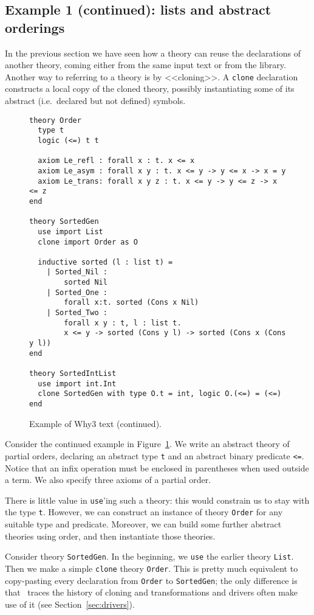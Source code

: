 \subsection{Example 1 (continued): lists and abstract orderings}

In the previous section we have seen how a theory can reuse the
declarations of another theory, coming either from the same input
text or from the library. Another way to referring to a theory is
by <<cloning>>. A \texttt{clone} declaration constructs a local
copy of the cloned theory, possibly instantiating some of its
abstract (i.e.~declared but not defined) symbols.

\begin{figure}
\centering
\begin{verbatim}
theory Order
  type t
  logic (<=) t t

  axiom Le_refl : forall x : t. x <= x
  axiom Le_asym : forall x y : t. x <= y -> y <= x -> x = y
  axiom Le_trans: forall x y z : t. x <= y -> y <= z -> x <= z
end

theory SortedGen
  use import List
  clone import Order as O

  inductive sorted (l : list t) =
    | Sorted_Nil :
        sorted Nil
    | Sorted_One :
        forall x:t. sorted (Cons x Nil)
    | Sorted_Two :
        forall x y : t, l : list t.
        x <= y -> sorted (Cons y l) -> sorted (Cons x (Cons y l))
end

theory SortedIntList
  use import int.Int
  clone SortedGen with type O.t = int, logic O.(<=) = (<=)
end
\end{verbatim}
\caption{Example of Why3 text (continued).}
\label{fig:tutorial2}
\end{figure}

Consider the continued example in Figure~\ref{fig:tutorial2}.
We write an abstract theory of partial orders, declaring an
abstract type \texttt{t} and an abstract binary predicate
\texttt{<=}. Notice that an infix operation must be enclosed
in parentheses when used outside a term. We also specify
three axioms of a partial order.

There is little value in \texttt{use}'ing such a theory: this
would constrain us to stay with the type \texttt{t}. However,
we can construct an instance of theory \texttt{Order} for
any suitable type and predicate. Moreover, we can build some
further abstract theories using order, and then instantiate
those theories.

Consider theory \texttt{SortedGen}. In the beginning, we
\texttt{use} the earlier theory \texttt{List}. Then we
make a simple \texttt{clone} theory \texttt{Order}.
This is pretty much equivalent to copy-pasting every
declaration from \texttt{Order} to \texttt{SortedGen};
the only difference is that \why\ traces the history
of cloning and transformations and drivers often make
use of it (see Section~\ref{sec:drivers}).

